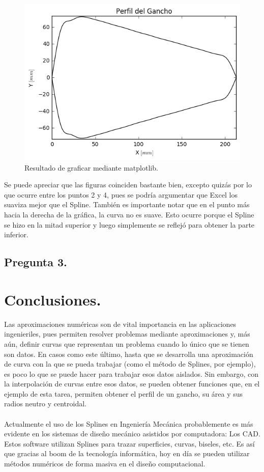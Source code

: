\documentclass[12pt, notitlepage]{article}
\begin{document}
\begin{figure}[H]
\centering
\includegraphics[scale=0.8]{Perfil_Gancho.png}
\caption{Resultado de graficar mediante matplotlib.}
\end{figure}

Se puede apreciar que las figuras coinciden bastante bien, excepto quizás por lo que ocurre entre los puntos 2 y 4, pues se podría argumentar que Excel los suaviza mejor que el Spline. También es importante notar que en el punto más hacia la derecha de la gráfica, la curva no es suave. Esto ocurre porque el Spline se hizo en la mitad superior y luego simplemente se reflejó para obtener la parte inferior.

\subsection{Pregunta 3.}

\section{Conclusiones.}
Las aproximaciones numéricas son de vital importancia en las aplicaciones ingenieriles, pues permiten resolver problemas mediante aproximaciones y, más aún, definir curvas que representan un problema cuando lo único que se tienen son datos. En casos como este último, hasta que se desarrolla una aproximación de curva con la que se pueda trabajar (como el método de Splines, por ejemplo), es poco lo que se puede hacer para trabajar esos datos aislados. Sin embargo, con la interpolación de curvas entre esos datos, se pueden obtener funciones que, en el ejemplo de esta tarea, permiten obtener el perfil de un gancho, su área y sus radios neutro y centroidal.\\\\
Actualmente el uso de los Splines en Ingeniería Mecánica probablemente es más evidente en los sistemas de diseño mecánico asistidos por computadora: Los CAD. Estos software utilizan Splines para trazar superficies, curvas, biseles, etc. Es así que gracias al boom de la tecnología informática, hoy en día se pueden utilizar métodos numéricos de forma masiva en el diseño computacional.
\end{document}
